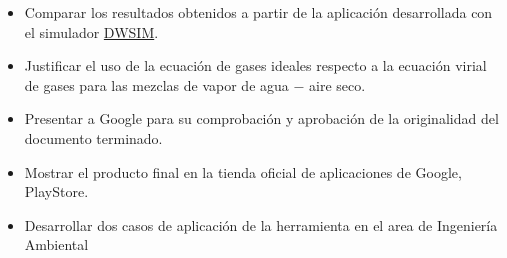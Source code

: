 \begin{itemize}
            \item Comparar los resultados obtenidos a partir de la aplicación desarrollada con el simulador \href{https://dwsim.fossee.in}{DWSIM}.
            \item Justificar el uso de la ecuación de gases ideales respecto a la ecuación virial de gases para las mezclas de vapor de agua $-$ aire seco. %

            \item Presentar a Google para su comprobación y aprobación de la originalidad del  documento terminado.
            \item Mostrar el producto final en la tienda oficial de aplicaciones de Google, PlayStore.
            \item Desarrollar dos casos de aplicación de la herramienta en el area de Ingeniería Ambiental 
            
    
        \end{itemize}